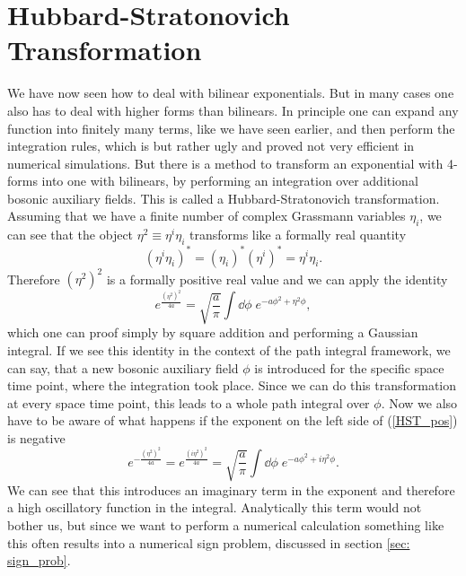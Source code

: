 \section{Hubbard-Stratonovich Transformation} \label{sec: HS_trafo}
We have now seen how to deal with bilinear exponentials. But in many cases one also has to deal with higher forms than bilinears. In principle one can expand any function into finitely many terms, like we have seen earlier, and then perform the integration rules, which is but rather ugly and proved not very efficient in numerical simulations. But there is a method to transform an exponential with 4-forms into one with bilinears, by performing an integration over additional bosonic auxiliary fields. This is called a Hubbard-Stratonovich transformation. Assuming that we have a finite number of complex Grassmann variables $\eta_{i}$, we can see that the object $\eta^{2}\equiv \eta^{i}\eta_{i}$ transforms like a formally real quantity
\begin{equation}
\left(\eta^{i}\eta_{i}\right)^{\ast}=\left(\eta_{i}\right)^{\ast}\left(\eta^{i}\right)^{\ast} =\eta^{i}\eta_{i}.
\end{equation}
Therefore $\left(\eta^{2}\right)^{2}$ is a formally positive real value and we can apply the identity
\begin{equation}
e ^{\frac{(\eta^{2})^{2}}{4a}}=\sqrt{\frac{a}{\pi}} \int\dd\phi\;e ^{-a\phi^{2}+\eta^{2}\phi},
\label{HST_pos}
\end{equation}
which one can proof simply by square addition and performing a Gaussian integral. If we see this identity in the context of the path integral  framework, we can say, that a new bosonic auxiliary field $\phi$ is introduced for the specific space time point, where the integration took place. Since we can do this transformation at every space time point, this leads to a whole path integral  over $\phi$. Now we also have to be aware of what happens if the exponent on the left side of (\ref{HST_pos}) is negative
\begin{equation}
e ^{-\frac{(\eta^{2})^{2}}{4a}}=e ^{\frac{(i\eta^{2})^{2}}{4a}}=\sqrt{\frac{a}{\pi}} \int\dd\phi\; e ^{-a\phi^{2}+i\eta^{2}\phi}.
\end{equation}
We can see that this introduces an imaginary term in the exponent and therefore a high oscillatory function in the integral. Analytically this term would not bother us, but since we want to perform a numerical calculation something like this often results into a numerical sign problem, discussed in section \ref{sec: sign_prob}.
